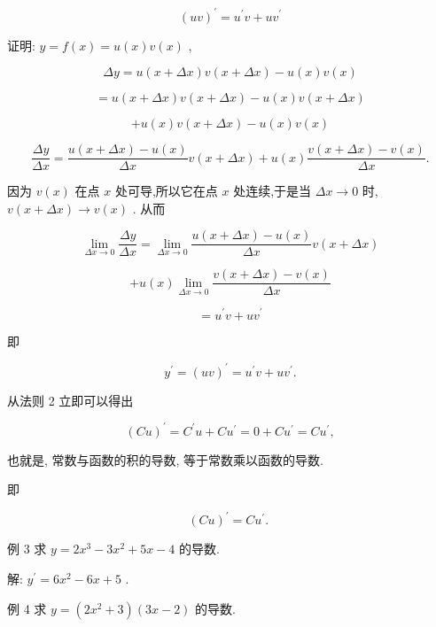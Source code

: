 \documentclass[10pt]{article}
\begin{document}
\[
{\left( uv\right) }^{\prime } = {u}^{\prime }v + u{v}^{\prime }
\]

证明: \(y = f\left( x\right) = u\left( x\right) v\left( x\right)\) ,

\[
{\Delta y} = u\left( {x + {\Delta x}}\right) v\left( {x + {\Delta x}}\right) - u\left( x\right) v\left( x\right)
\]

\[
= u\left( {x + {\Delta x}}\right) v\left( {x + {\Delta x}}\right) - u\left( x\right) v\left( {x + {\Delta x}}\right)
\]

\[
+ u\left( x\right) v\left( {x + {\Delta x}}\right) - u\left( x\right) v\left( x\right)
\]

\[
\frac{\Delta y}{\Delta x} = \frac{u\left( {x + {\Delta x}}\right) - u\left( x\right) }{\Delta x}v\left( {x + {\Delta x}}\right) + u\left( x\right) \frac{v\left( {x + {\Delta x}}\right) - v\left( x\right) }{\Delta x}.
\]

因为 \(v\left( x\right)\) 在点 \(x\) 处可导,所以它在点 \(x\) 处连续,于是当 \({\Delta x} \rightarrow 0\) 时, \(v\left( {x + {\Delta x}}\right) \rightarrow v\left( x\right)\) . 从而

\[
\mathop{\lim }\limits_{{{\Delta x} \rightarrow 0}}\frac{\Delta y}{\Delta x} = \mathop{\lim }\limits_{{{\Delta x} \rightarrow 0}}\frac{u\left( {x + {\Delta x}}\right) - u\left( x\right) }{\Delta x}v\left( {x + {\Delta x}}\right)
\]

\[
+ u\left( x\right) \mathop{\lim }\limits_{{{\Delta x} \rightarrow 0}}\frac{v\left( {x + {\Delta x}}\right) - v\left( x\right) }{\Delta x}
\]

\[
= {u}^{\prime }v + u{v}^{\prime }
\]

即

\[
{y}^{\prime } = {\left( uv\right) }^{\prime } = {u}^{\prime }v + u{v}^{\prime }.
\]

从法则 2 立即可以得出

\[
{\left( Cu\right) }^{\prime } = {C}^{\prime }u + C{u}^{\prime } = 0 + C{u}^{\prime } = C{u}^{\prime },
\]

也就是, 常数与函数的积的导数, 等于常数乘以函数的导数.

即

\[
{\left( Cu\right) }^{\prime } = C{u}^{\prime }\text{. }
\]

例 3 求 \(y = 2{x}^{3} - 3{x}^{2} + {5x} - 4\) 的导数.

解: \({y}^{\prime } = 6{x}^{2} - {6x} + 5\) .

例 4 求 \(y = \left( {2{x}^{2} + 3}\right) \left( {{3x} - 2}\right)\) 的导数.
\end{document}

